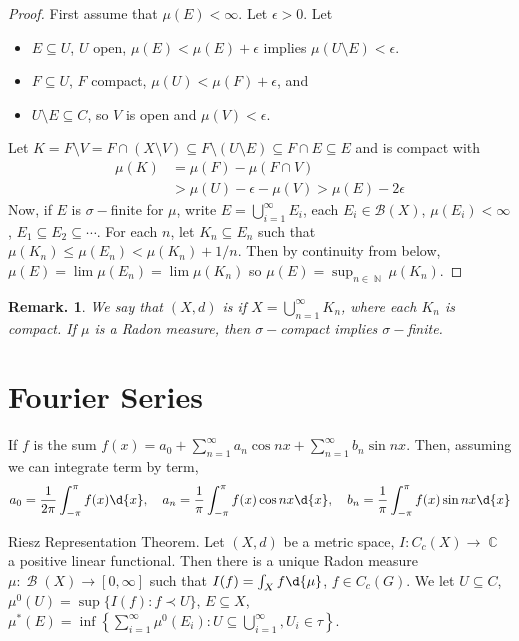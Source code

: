 \documentclass[11pt, a4paper]{memoir}
\DeclareMathOperator{\N}{{\mathbb{N}}}
\DeclareMathOperator{\C}{{\mathbb{C}}}
\theoremstyle{change}
\theoremstyle{plain}
\theoremstyle{nonumberplain}
\newtheorem{remark}{Remark.}
\newtheorem{proof}{Proof}
\DeclareMathOperator{\B}{{\mathcal{B}}}
\begin{document}
\begin{proof}
    First assume that $\mu(E)<\infty$.
    Let $\epsilon>0$.
    Let
    \begin{itemize}[nolistsep]
        \item $E\subseteq U$, $U$ open, $\mu(E)<\mu(E)+\epsilon$ implies $\mu(U\setminus E)<\epsilon$.
        \item $F\subseteq U$, $F$ compact, $\mu(U)<\mu(F)+\epsilon$, and
        \item $U\setminus E\subseteq C$, so $V$ is open and $\mu(V)<\epsilon$.
    \end{itemize}
    Let $K=F\setminus V=F\cap(X\setminus V)\subseteq F\setminus(U\setminus E)\subseteq F\cap E\subseteq E$ and is compact with
    \begin{align*}
        \mu(K) &= \mu(F)-\mu(F\cap V)\\
               &> \mu(U)-\epsilon-\mu(V)>\mu(E)-2\epsilon
    \end{align*}
    Now, if $E$ is $\sigma-$finite for $\mu$, write $E=\bigcup_{i=1}^\infty E_i$, each $E_i\in\mathcal{B}(X)$, $\mu(E_i)<\infty$, $E_1\subseteq E_2\subseteq\cdots$.
    For each $n$, let $K_n\subseteq E_n$ such that $\mu(K_n)\leq\mu(E_n)<\mu(K_n)+1/n$.
    Then by continuity from below, $\mu(E)=\lim\mu(E_n)=\lim\mu(K_n)$ so $\mu(E)=\sup_{n\in\N}\mu(K_n)$.
\end{proof}
\begin{remark}
    We say that $(X,d)$ is  if $X=\bigcup_{n=1}^\infty K_n$, where each $K_n$ is compact.
    If $\mu$ is a Radon measure, then $\sigma-$compact implies $\sigma-$finite.
\end{remark}
\chapter{Fourier Series}
If $f$ is the sum $f(x)=a_0+\sum_{n=1}^\infty a_n\cos nx+\sum_{n=1}^\infty b_n\sin nx$.
Then, assuming we can integrate term by term,
\begin{equation*}
    a_0=\frac{1}{2\pi}\int_{-\pi}^\pi f(x)\d{x},\quad a_n=\frac{1}{\pi}\int_{-\pi}^\pi f(x)\cos nx\d{x},\quad b_n=\frac{1}{\pi}\int_{-\pi}^\pi f(x)\sin nx\d{x}
\end{equation*}

Riesz Representation Theorem.
Let $(X,d)$ be a metric space, $I:C_c(X)\to\C$ a positive linear functional.
Then there is a unique Radon measure $\mu:\B(X)\to[0,\infty]$ such that $I(f)=\int_X f\d{\mu}$, $f\in C_c(G)$.
We let $U\subseteq C$, $\mu^0(U)=\sup\{I(f):f\prec U\}$, $E\subseteq X$, $\mu^*(E)=\inf\left\{\sum_{i=1}^\infty\mu^0(E_i):U\subseteq\bigcup_{i=1}^\infty,U_i\in\tau\right\}$.
\end{document}
